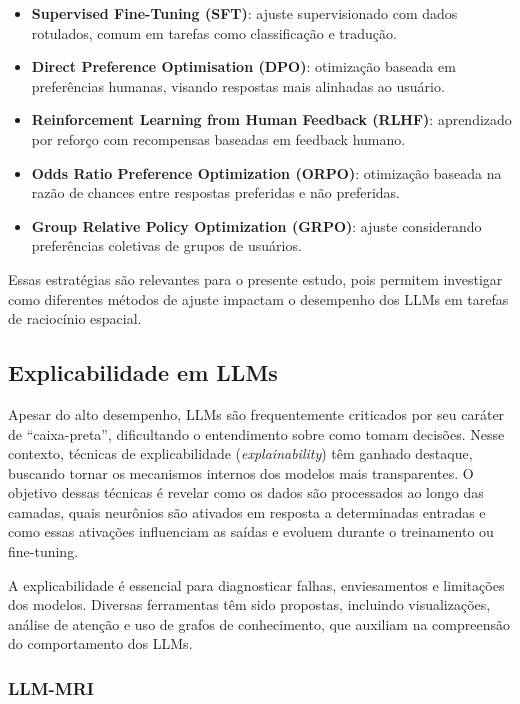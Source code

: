 \begin{itemize}
    \item \textbf{Supervised Fine-Tuning (SFT)}: ajuste supervisionado com dados rotulados, comum em tarefas como classificação e tradução.
    \item \textbf{Direct Preference Optimisation (DPO)}: otimização baseada em preferências humanas, visando respostas mais alinhadas ao usuário.
    \item \textbf{Reinforcement Learning from Human Feedback (RLHF)}: aprendizado por reforço com recompensas baseadas em feedback humano.
    \item \textbf{Odds Ratio Preference Optimization (ORPO)}: otimização baseada na razão de chances entre respostas preferidas e não preferidas.
    \item \textbf{Group Relative Policy Optimization (GRPO)}: ajuste considerando preferências coletivas de grupos de usuários.
\end{itemize}

Essas estratégias são relevantes para o presente estudo, pois permitem investigar como diferentes métodos de ajuste impactam o desempenho dos LLMs em tarefas de raciocínio espacial.

\subsection{Explicabilidade em LLMs}

Apesar do alto desempenho, LLMs são frequentemente criticados por seu caráter de ``caixa-preta'', dificultando o entendimento sobre como tomam decisões. Nesse contexto, técnicas de explicabilidade (\textit{explainability}) têm ganhado destaque, buscando tornar os mecanismos internos dos modelos mais transparentes. O objetivo dessas técnicas é revelar como os dados são processados ao longo das camadas, quais neurônios são ativados em resposta a determinadas entradas e como essas ativações influenciam as saídas e evoluem durante o treinamento ou fine-tuning.

A explicabilidade é essencial para diagnosticar falhas, enviesamentos e limitações dos modelos. Diversas ferramentas têm sido propostas, incluindo visualizações, análise de atenção e uso de grafos de conhecimento, que auxiliam na compreensão do comportamento dos LLMs.

\subsubsection{LLM-MRI}

